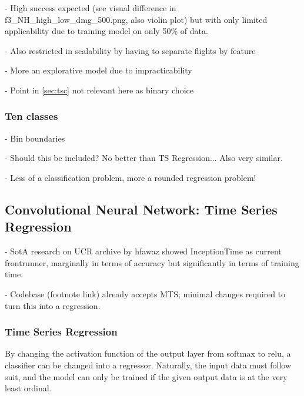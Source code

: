 - High success expected (see visual difference in f3\_NH\_high\_low\_dmg\_500.png, also violin plot) but with only limited applicability due to training model on only 50\% of data.

- Also restricted in scalability by having to separate flights by feature

- More an explorative model due to impracticability

- Point in \ref{sec:tsc} not relevant here as binary choice

\subsubsection{Ten classes}
- Bin boundaries

- Should this be included? No better than TS Regression... Also very similar.

- Less of a classification problem, more a rounded regression problem!

\subsection{Convolutional Neural Network: Time Series Regression}
- SotA research on UCR archive by hfawaz showed InceptionTime as current frontrunner, marginally in terms of accuracy but significantly in terms of training time.

- Codebase (footnote link) already accepts MTS; minimal changes required to turn this into a regression.

\subsubsection{Time Series Regression}
By changing the activation function of the output layer from softmax to \ac{relu}, a classifier can be changed into a regressor. Naturally, the input data must follow suit, and the model can only be trained if the given output data is at the very least ordinal.

